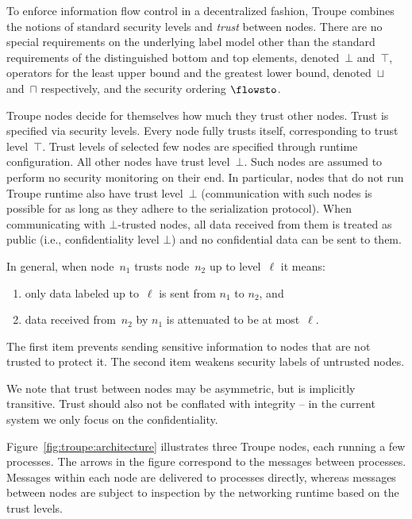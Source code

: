 To  enforce information flow control in a decentralized fashion, Troupe combines the notions of standard security levels and \emph{trust} between nodes.
There are no special requirements on the underlying label model other than the standard requirements of the distinguished bottom and top elements, denoted~$\bot$ and~$\top$, operators for the least upper bound and the greatest lower bound, denoted~$\sqcup$ and~$\sqcap$ respectively, and the security ordering $\flowsto$.

Troupe nodes decide for themselves how much they trust other nodes.
Trust is specified via security levels. Every node fully trusts itself, corresponding to trust level~$\top$. Trust levels of selected few nodes are specified through runtime configuration. All other nodes have trust level~$\bot$. Such nodes are assumed to perform no security monitoring on their end. In particular, nodes that do not run Troupe runtime also have trust level~$\bot$ (communication with such nodes is possible for as long as they adhere to the serialization protocol). When communicating with $\bot$-trusted nodes, all data received from them is treated as public (i.e., confidentiality level $\bot$) and no confidential data can be sent to them.

In general, when node~$n_1$ trusts node~$n_2$ up to level~$\ell$ it means:
\begin{enumerate}
    \item only data labeled up to~$\ell$ is sent from $n_1$ to $n_2$, and
    \item data received from~$n_2$ by $n_1$ is attenuated to be at most~$\ell$.
\end{enumerate}

\noindent
The first item prevents sending sensitive information to nodes that are not trusted to protect it. The second item weakens security labels of untrusted nodes.


 We note that trust between nodes may be asymmetric, but is implicitly transitive. Trust should also not be conflated with integrity -- in the current system we only focus on the confidentiality.

Figure~\ref{fig:troupe:architecture} illustrates three Troupe nodes, each running a few processes. The arrows in the figure correspond to the messages between processes. Messages within each node are delivered to processes directly, whereas messages between nodes are subject to inspection by the networking runtime based on the trust levels. %

